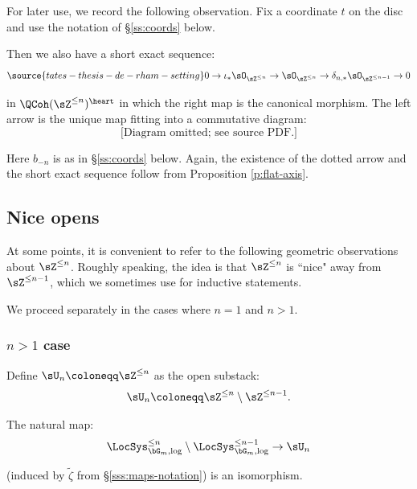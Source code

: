 \begin{variant}
\notready

For later use, we record the following observation. Fix
a coordinate $t$ on the disc and use the notation of \S \ref{ss:coords} below.

Then we also have a short exact sequence:
%
\begin{equation}\label{eq:fund-ses-2}
\source{tates-thesis-de-rham-setting}
0 \to \iota_*\sO_{\sZ^{\leq n}} \to \sO_{\sZ^{\leq n}} \to
\delta_{n,*}\sO_{\sZ^{\leq n-1}} \to 0
\end{equation}

 in $\QCoh(\sZ^{\leq n})^{\heart}$ in which the right
map is the canonical morphism. The left arrow is the unique map fitting
into a commutative diagram:
%
\[
\text{[Diagram omitted; see source PDF.]}
\]

 Here $b_{-n}$ is as in \S \ref{ss:coords} below.
Again, the existence of the dotted arrow and the short exact sequence
follow from Proposition \ref{p:flat-axis}.

\end{variant}

\subsection{Nice opens}\label{ss:un}

At some points, it is convenient to refer to the following geometric observations
about $\sZ^{\leq n}$. Roughly speaking, the idea is that
$\sZ^{\leq n}$ is ``nice" away from $\sZ^{\leq n-1}$, which we sometimes use
for inductive statements.

We proceed separately in the cases where $n = 1$ and $n > 1$.


\subsubsection{$n>1$ case}

Define $\sU_n \coloneqq \sZ^{\leq n}$ as the open substack:
%
\[
\sU_n \coloneqq \sZ^{\leq n} \setminus \sZ^{\leq n-1}.
\]

\begin{lem}
\notready\label{l:un}

The natural map:
%
\[
\LocSys_{\bG_m,\log}^{\leq n} \setminus \LocSys_{\bG_m,\log}^{\leq n-1}
\to
\sU_n
\]

 (induced by $\widetilde{\zeta}$ from \S \ref{sss:maps-notation})
is an isomorphism.

\end{lem}

